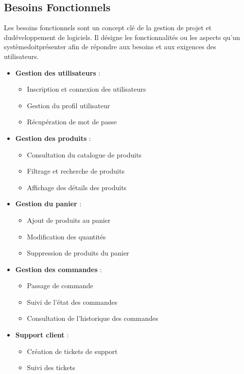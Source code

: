 \documentclass[12pt,a4paper]{report}
\begin{document}
\subsection{Besoins Fonctionnels}
Les besoins fonctionnels sont un concept clé de la gestion de projet et dudéveloppement de logiciels. Il désigne les fonctionnalités ou les aspects qu'un systèmedoitprésenter afin de répondre aux besoins et aux exigences des utilisateurs.
\begin{itemize}
    \item \textbf{Gestion des utilisateurs}  :
    \begin{itemize}
        \item Inscription et connexion des utilisateurs 
        \item Gestion du profil utilisateur 
        \item Récupération de mot de passe 
    \end{itemize}
    
    \item \textbf{Gestion des produits}  :
    \begin{itemize}
        \item Consultation du catalogue de produits 
        \item Filtrage et recherche de produits 
        \item Affichage des détails des produits 
    \end{itemize}
    
    \item \textbf{Gestion du panier}  :
    \begin{itemize}
        \item Ajout de produits au panier 
        \item Modification des quantités 
        \item Suppression de produits du panier 
    \end{itemize}
    
    \item \textbf{Gestion des commandes}  :
    \begin{itemize}
        \item Passage de commande 
        \item Suivi de l'état des commandes 
        \item Consultation de l'historique des commandes 
    \end{itemize}
    
    \item \textbf{Support client}  :
    \begin{itemize}
        \item Création de tickets de support 
        \item Suivi des tickets 
        
    \end{itemize}
\end{itemize}
\end{document}
